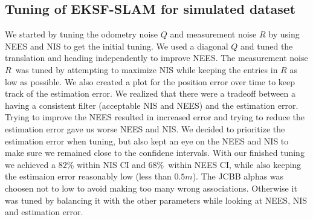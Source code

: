 \subsection{Tuning of EKSF-SLAM for simulated dataset}
We started by tuning the odometry noise $Q$ and measurement noise $R$ by using NEES and NIS to get the initial tuning. We used a diagonal $Q$ and tuned the translation and heading independently to improve NEES. The measurement noise $R$ was tuned by attempting to maximize NIS while keeping the entries in $R$ as low as possible. We also created a plot for the position error over time to keep track of the estimation error. We realized that there were a tradeoff between a having a consistent filter (acceptable NIS and NEES) and the estimation error. Trying to improve the NEES resulted in increased error and trying to reduce the estimation error gave us worse NEES and NIS. We decided to prioritize the estimation error when tuning, but also kept an eye on the NEES and NIS to make sure we remained close to the confidene intervals. With our finished tuning we achieved a $82\%$ within NIS CI and $68\%$ within NEES CI, while also keeping the estimaion error reasonably low (less than $0.5m$). The JCBB alphas was choosen not to low to avoid making too many wrong associations. Otherwise it was tuned by balancing it with the other parameters while looking at NEES, NIS and estimation error. 

